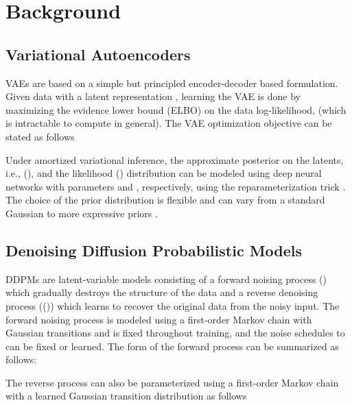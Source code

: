 \documentclass[10pt]{article} \usepackage[accepted]{tmlr}
\begin{document}
\section{Background}
\label{sec:background}

\subsection{Variational Autoencoders}

\label{subsec:bg_vae}
VAEs \citep{kingma2014autoencoding, rezende2016variational} are based on a simple but principled encoder-decoder based formulation. Given data  with a latent representation , learning the VAE is done by maximizing the evidence lower bound (ELBO) on the data log-likelihood,  (which is intractable to compute in general). The VAE optimization objective can be stated as follows

Under amortized variational inference, the approximate posterior on the latents, i.e., (),  and the likelihood ()  distribution can be modeled using deep neural networks with parameters  and , respectively, using the reparameterization trick \citep{kingma2014autoencoding, rezende2016variational}. The choice of the prior distribution  is flexible and can vary from a standard Gaussian \citep{kingma2014autoencoding} to more expressive priors \citep{berg2019sylvester, grathwohl2018ffjord, kingma2017improving}.

\subsection{Denoising Diffusion Probabilistic Models}

DDPMs \citep{sohldickstein2015deep, ho2020denoising} are latent-variable models consisting of a forward noising process () which gradually destroys the structure of the data  and a reverse denoising process (()) which learns to recover the original data  from the noisy input. The forward noising process is modeled using a first-order Markov chain with Gaussian transitions and is fixed throughout training, and the noise schedules  to  can be fixed or learned. The form of the forward process can be summarized as follows:






The reverse process  can also be parameterized using a first-order Markov chain with a learned Gaussian transition distribution as follows
\end{document}
